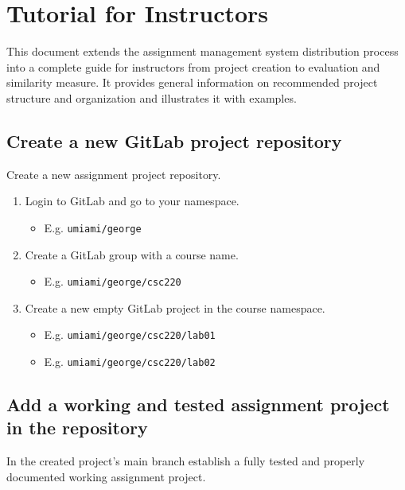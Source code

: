 \chapter{Tutorial for Instructors} \label{app:tut-ins}

{This document extends the assignment management system distribution process into a complete guide for instructors from project creation to evaluation and similarity measure. It provides general information on recommended project structure and organization and illustrates it with examples.}

\section{Create a new GitLab project repository} \label{ssec:createnewglrep}

{Create a new assignment project repository.}

\begin{enumerate}
\item
  {Login to GitLab and go to your namespace.}
    \begin{itemize}
    \item
      {E.g. \texttt{umiami/george}}
    \end{itemize}
\item
  {Create a GitLab group with a course name.}
    \begin{itemize}
    \item
      {E.g. \texttt{umiami/george/csc220}}
    \end{itemize}
\item
  {Create a new empty GitLab project in the course namespace.}
    \begin{itemize}
    \item
      {E.g. \texttt{umiami/george/csc220/lab01}}
    \item
      {E.g. \texttt{umiami/george/csc220/lab02}}
    \end{itemize}
\end{enumerate}

\section{Add a working and tested assignment project in the repository} \label{ssec:addworking}

{In the created project's main branch establish a fully tested and properly documented working assignment project.}

